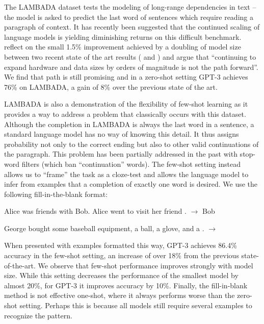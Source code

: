 \documentclass{article}
\begin{document}
The LAMBADA dataset \cite{paperno2016lambada} tests the modeling of long-range dependencies in text -- the model is asked to predict the last word of sentences which require reading a paragraph of context. It has recently been suggested that the continued scaling of language models is yielding diminishing returns on this difficult benchmark. \cite{bisk2020experience} reflect on the small 1.5\% improvement achieved by a doubling of model size between two recent state of the art results (\cite{shoeybi2019megatronlm} and \cite{turing_17m}) and argue that ``continuing to expand hardware and data sizes by orders of magnitude is not the path forward''. We find that path is still promising and in a zero-shot setting GPT-3 achieves 76\% on LAMBADA, a gain of 8\% over the previous state of the art.

LAMBADA is also a demonstration of the flexibility of few-shot learning as it provides a way to address a problem that classically occurs with this dataset. Although the completion in LAMBADA is always the last word in a sentence, a standard language model has no way of knowing this detail. It thus assigns probability not only to the correct ending but also to other valid continuations of the paragraph. This problem has been partially addressed in the past with stop-word filters \cite{radford2019language} (which ban ``continuation'' words). The few-shot setting instead allows us to ``frame'' the task as a cloze-test and allows the language model to infer from examples that a completion of exactly one word is desired. We use the following fill-in-the-blank format:

\hspace{3cm}Alice was friends with Bob.  Alice went to visit her friend \underline{\hspace{1cm}}. $\to$ Bob

\hspace{3cm}George bought some baseball equipment, a ball, a glove, and a \underline{\hspace{1cm}}. $\to$ 

When presented with examples formatted this way, GPT-3 achieves 86.4\% accuracy in the few-shot setting, an increase of over 18\% from the previous state-of-the-art. We observe that few-shot performance improves strongly with model size. While this setting decreases the performance of the smallest model by almost 20\%, for GPT-3 it improves accuracy by 10\%. Finally, the fill-in-blank method is not effective one-shot, where it always performs worse than the zero-shot setting. Perhaps this is because all models still require several examples to recognize the pattern.
\end{document}
